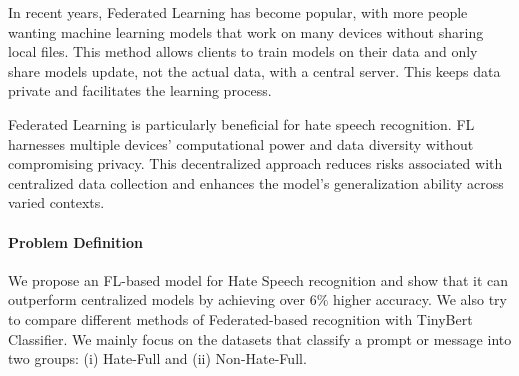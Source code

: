 \documentclass[11pt]{article}
\begin{document}
In recent years, Federated Learning has become popular, with more people wanting machine learning models that work on many devices without sharing local files. This method allows clients to train models on their data and only share models update, not the actual data, with a central server. This keeps data private and facilitates the learning process.


Federated Learning is particularly beneficial for hate speech recognition. FL harnesses multiple devices' computational power and data diversity without compromising privacy. This decentralized approach reduces risks associated with centralized data collection and enhances the model's generalization ability across varied contexts. 

\paragraph{Problem Definition} 
We propose an FL-based model for Hate Speech recognition and show that it can outperform centralized models by achieving over $6\%$ higher accuracy. We also try to compare different methods of Federated-based recognition with TinyBert Classifier. We mainly focus on the datasets that classify a prompt or message into two groups: (i) Hate-Full and (ii) Non-Hate-Full.
\end{document}
